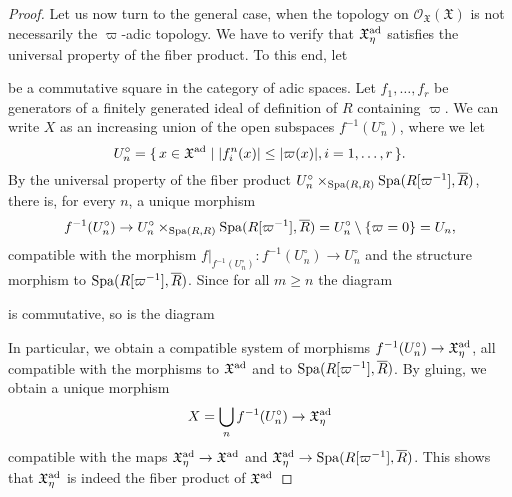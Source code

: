 \documentclass[12pt,twoside,a4paper]{article}
\theoremstyle{definition}
\theoremstyle{remark}
\newcommand\ad{{\rm ad}}
\newcommand\Spa{{\rm Spa}}
\begin{document}
\begin{proof}
Let us now turn to the general case, when the topology on $\mathcal{O}_{\mathfrak{X}}(\mathfrak{X})$ is not necessarily the $\varpi$-adic topology. We have to verify that $\mathfrak{X}_{\eta}^{\ad}$ satisfies the universal property of the fiber product. To this end, let \begin{center}\end{center}be a commutative square in the category of adic spaces. Let $f_1,\dots, f_r$ be generators of a finitely generated ideal of definition of $R$ containing $\varpi$. We can write $X$ as an increasing union of the open subspaces $f^{-1}(U_{n}^{\circ})$, where we let \begin{equation*}U_{n}^{\circ}=\{\, x\in \mathfrak{X}^{\ad}\mid \vert f_{i}^{n}(x)\vert\leq\vert\varpi(x)\vert, i=1,\dots,r\,\}.\end{equation*}By the universal property of the fiber product $U_{n}^{\circ}\times_{\Spa(R, R)}\Spa(R[\varpi^{-1}], \overline{R})$, there is, for every $n$, a unique morphism \begin{equation*}f^{-1}(U_{n}^{\circ})\to U_{n}^{\circ}\times_{\Spa(R, R)}\Spa(R[\varpi^{-1}], \overline{R})=U_{n}^{\circ}\setminus\{\varpi=0\}=U_{n},\end{equation*}compatible with the morphism $f\vert_{f^{-1}(U_{n}^{\circ})}: f^{-1}(U_{n}^{\circ})\to U_{n}^{\circ}$ and the structure morphism to $\Spa(R[\varpi^{-1}], \overline{R})$. Since for all $m\geq n$ the diagram \begin{center}\end{center}is commutative, so is the diagram \begin{center}\end{center}In particular, we obtain a compatible system of morphisms $f^{-1}(U_{n}^{\circ})\to \mathfrak{X}_{\eta}^{\ad}$, all compatible with the morphisms to $\mathfrak{X}^{\ad}$ and to $\Spa(R[\varpi^{-1}], \overline{R})$. By gluing, we obtain a unique morphism \begin{equation*}X=\bigcup_{n}f^{-1}(U_{n}^{\circ})\to \mathfrak{X}_{\eta}^{\ad}\end{equation*}compatible with the maps $\mathfrak{X}_{\eta}^{\ad}\to \mathfrak{X}^{\ad}$ and $\mathfrak{X}_{\eta}^{\ad}\to \Spa(R[\varpi^{-1}], \overline{R})$. This shows that $\mathfrak{X}_{\eta}^{\ad}$ is indeed the fiber product of $\mathfrak{X}^{\ad}$ 
\end{proof}
\end{document}
